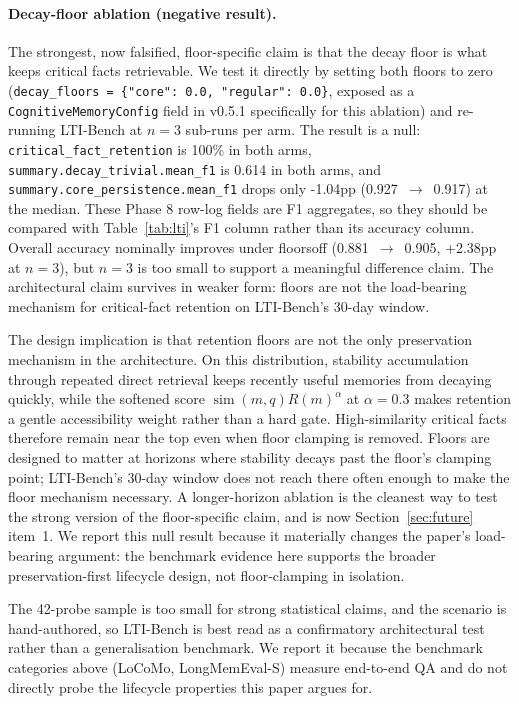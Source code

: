 \documentclass[11pt,a4paper]{article}
\begin{document}
\paragraph{Decay-floor ablation (negative result).}
\label{sec:eval-lti-floor-ablation}
The strongest, now falsified, floor-specific claim is that the decay floor is what keeps critical facts retrievable. We test it directly by setting both floors to zero (\texttt{decay\_floors = \{"core": 0.0, "regular": 0.0\}}, exposed as a \texttt{CognitiveMemoryConfig} field in v0.5.1 specifically for this ablation) and re-running LTI-Bench at $n{=}3$ sub-runs per arm. The result is a null: \texttt{critical\_fact\_retention} is 100\% in both arms, \texttt{summary.decay\_trivial.mean\_f1} is 0.614 in both arms, and \texttt{summary.core\_persistence.mean\_f1} drops only -1.04pp (0.927~$\rightarrow$~0.917) at the median. These Phase 8 row-log fields are F1 aggregates, so they should be compared with Table~\ref{tab:lti}'s F1 column rather than its accuracy column. Overall accuracy nominally improves under floors\textendash off (0.881~$\rightarrow$~0.905, +2.38pp at $n{=}3$), but $n{=}3$ is too small to support a meaningful difference claim. The architectural claim survives in weaker form: floors are not the load-bearing mechanism for critical-fact retention on LTI-Bench's 30-day window.

The design implication is that retention floors are not the only preservation mechanism in the architecture. On this distribution, stability accumulation through repeated direct retrieval keeps recently useful memories from decaying quickly, while the softened score $\operatorname{sim}(m,q) R(m)^\alpha$ at $\alpha{=}0.3$ makes retention a gentle accessibility weight rather than a hard gate. High-similarity critical facts therefore remain near the top even when floor clamping is removed. Floors are designed to matter at horizons where stability decays past the floor's clamping point; LTI-Bench's 30-day window does not reach there often enough to make the floor mechanism necessary. A longer-horizon ablation is the cleanest way to test the strong version of the floor-specific claim, and is now Section~\ref{sec:future} item~1. We report this null result because it materially changes the paper's load-bearing argument: the benchmark evidence here supports the broader preservation-first lifecycle design, not floor-clamping in isolation.

The 42-probe sample is too small for strong statistical claims, and the scenario is hand-authored, so LTI-Bench is best read as a confirmatory architectural test rather than a generalisation benchmark. We report it because the benchmark categories above (LoCoMo, LongMemEval-S) measure end-to-end QA and do not directly probe the lifecycle properties this paper argues for.
\end{document}
